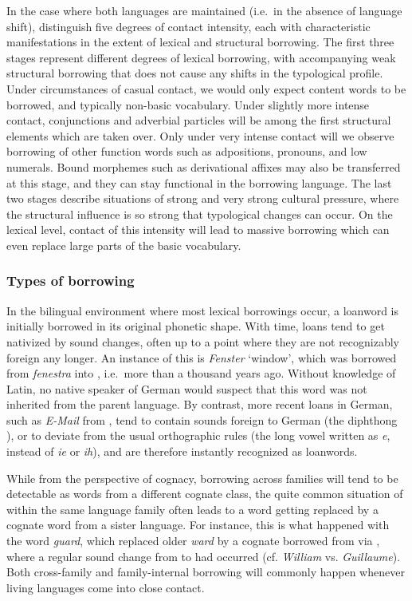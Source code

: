 In the case where both languages are maintained (i.e.\ in the absence of language shift), \citet{thomason_kaufman_1988} distinguish five degrees of contact intensity, each with characteristic manifestations in the extent of lexical and structural borrowing. The first three stages represent different degrees of lexical borrowing, with accompanying weak structural borrowing that does not cause any shifts in the typological profile. Under circumstances of casual contact, we would only expect content words to be borrowed, and typically non-basic vocabulary. Under slightly more intense contact, conjunctions and adverbial particles will be among the first structural elements which are taken over. Only under very intense contact will we observe borrowing of other function words such as adpositions, pronouns, and low numerals. Bound morphemes such as derivational affixes may also be transferred at this stage, and they can stay functional in the borrowing language. The last two stages describe situations of strong 
and very strong cultural pressure, where the structural influence is so strong that typological changes can occur. On the lexical level, contact of this intensity will lead to massive borrowing which can even replace large parts of the basic vocabulary.

\subsubsection{Types of borrowing}
In the bilingual environment where most lexical borrowings occur, a loanword is initially borrowed in its original phonetic shape. With time, loans tend to get nativized by sound changes, often up to a point where they are not recognizably foreign any longer. An instance of this is  \textit{Fenster} `window', which was borrowed from  \textit{fenestra} into , i.e.\ more than a thousand years ago. Without knowledge of Latin, no native speaker of German would suspect that this word was not inherited from the parent language. By contrast, more recent loans in German, such as \textit{E-Mail} from , tend to contain sounds foreign to German (the diphthong \ipa{[eI]}), or to deviate from the usual orthographic rules (the long vowel \ipa{[i:]} written as \textit{e}, instead of \textit{ie} or \textit{ih}), and are therefore instantly recognized as loanwords.

While from the perspective of cognacy, borrowing across families will tend to be detectable as words from a different cognate class, the quite common situation of  within the same language family often leads to a word getting replaced by a cognate word from a sister language. For instance, this is what happened with the  word \textit{guard}, which replaced older \textit{ward} by a cognate borrowed from  via , where a regular sound change from \ipa{[w]} to \ipa{[g]} had occurred (cf. \textit{William} vs. \textit{Guillaume}). Both cross-family and family-internal borrowing will commonly happen whenever living languages come into close contact.

